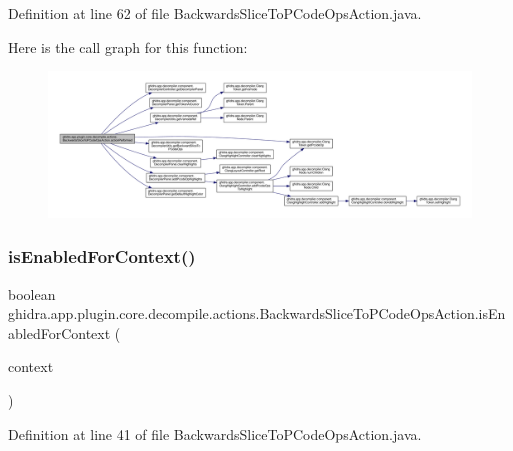 Definition at line 62 of file Backwards\+Slice\+To\+P\+Code\+Ops\+Action.\+java.

Here is the call graph for this function\+:
\nopagebreak
\begin{figure}[H]
\begin{center}
\leavevmode
\includegraphics[width=350pt]{classghidra_1_1app_1_1plugin_1_1core_1_1decompile_1_1actions_1_1_backwards_slice_to_p_code_ops_action_ad6dff03b45d55b7dbd9e1c60540bbec9_cgraph}
\end{center}
\end{figure}
\mbox{\label{classghidra_1_1app_1_1plugin_1_1core_1_1decompile_1_1actions_1_1_backwards_slice_to_p_code_ops_action_aec675d76eec5fcc0d1ba30e780e50e02}} 
\subsubsection{\texorpdfstring{isEnabledForContext()}{isEnabledForContext()}}
{\footnotesize\ttfamily boolean ghidra.\+app.\+plugin.\+core.\+decompile.\+actions.\+Backwards\+Slice\+To\+P\+Code\+Ops\+Action.\+is\+Enabled\+For\+Context (\begin{DoxyParamCaption}\item[{Action\+Context}]{context }\end{DoxyParamCaption})\hspace{0.3cm}{\ttfamily [inline]}}



Definition at line 41 of file Backwards\+Slice\+To\+P\+Code\+Ops\+Action.\+java.

